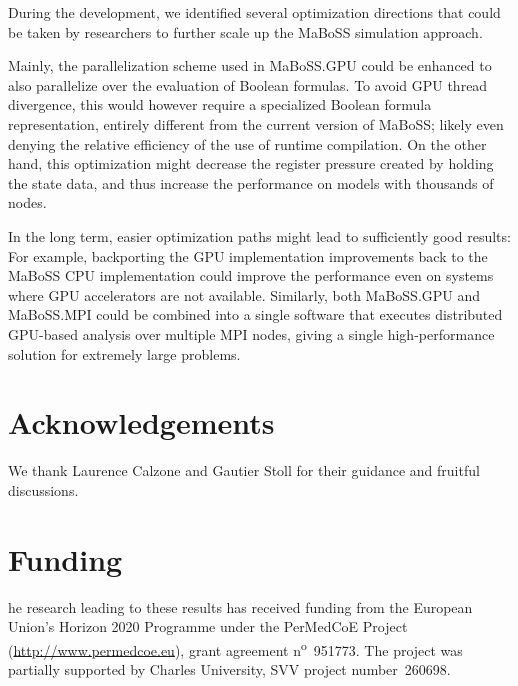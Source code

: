 \documentclass[a4paper,num-refs]{oup-contemporary}
\begin{document}
During the development, we identified several optimization directions that could be taken by researchers to further scale up the MaBoSS simulation approach.

Mainly, the parallelization scheme used in MaBoSS.GPU could be enhanced to also parallelize over the evaluation of Boolean formulas. To avoid GPU thread divergence, this would however require a specialized Boolean formula representation, entirely different from the current version of MaBoSS; likely even denying the relative efficiency of the use of runtime compilation. On the other hand, this optimization might decrease the register pressure created by holding the state data, and thus increase the performance on models with thousands of nodes.

In the long term, easier optimization paths might lead to sufficiently good results: For example, backporting the GPU implementation improvements back to the MaBoSS CPU implementation could improve the performance even on systems where GPU accelerators are not available. Similarly, both MaBoSS.GPU and MaBoSS.MPI could be combined into a single software that executes distributed GPU-based analysis over multiple MPI nodes, giving a single high-performance solution for extremely large problems.

\section{Acknowledgements}
We thank Laurence Calzone and Gautier Stoll for their guidance and fruitful discussions.

\section{Funding}
he research leading to these results has received funding from the European Union's Horizon 2020 Programme under the PerMedCoE Project (\url{http://www.permedcoe.eu}), grant agreement n\textsuperscript{o}~951773.
The project was partially supported by Charles University, SVV project number~260698.






\end{document}
